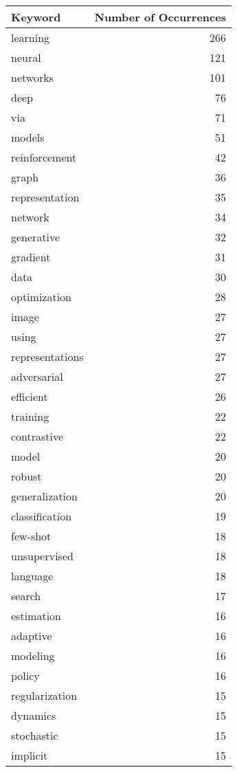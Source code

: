 \begin{table}[h]
\centering
\begin{tabular}{|l|r|}
\hline
Keyword & Number of Occurrences \\
\hline
learning & 266 \\
\hline
neural & 121 \\
\hline
networks & 101 \\
\hline
deep & 76 \\
\hline
via & 71 \\
\hline
models & 51 \\
\hline
reinforcement & 42 \\
\hline
graph & 36 \\
\hline
representation & 35 \\
\hline
network & 34 \\
\hline
generative & 32 \\
\hline
gradient & 31 \\
\hline
data & 30 \\
\hline
optimization & 28 \\
\hline
image & 27 \\
\hline
using & 27 \\
\hline
representations & 27 \\
\hline
adversarial & 27 \\
\hline
efficient & 26 \\
\hline
training & 22 \\
\hline
contrastive & 22 \\
\hline
model & 20 \\
\hline
robust & 20 \\
\hline
generalization & 20 \\
\hline
classification & 19 \\
\hline
few-shot & 18 \\
\hline
unsupervised & 18 \\
\hline
language & 18 \\
\hline
search & 17 \\
\hline
estimation & 16 \\
\hline
adaptive & 16 \\
\hline
modeling & 16 \\
\hline
policy & 16 \\
\hline
regularization & 15 \\
\hline
dynamics & 15 \\
\hline
stochastic & 15 \\
\hline
implicit & 15 \\

\end{tabular}
\end{table}
